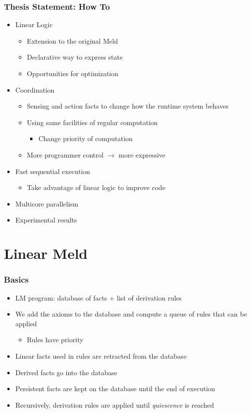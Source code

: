 \documentclass{beamer}
\begin{document}
\begin{frame}[fragile]
   \frametitle{Thesis Statement: How To}
   \begin{itemize}
      \item Linear Logic
      \begin{itemize}
         \item Extension to the original Meld
         \item Declarative way to express state
         \item Opportunities for optimization
      \end{itemize}
      \item Coordination
      \begin{itemize}
         \item Sensing and action facts to change how the runtime system behaves
         \item Using same facilities of regular computation
         \begin{itemize}
            \item Change priority of computation 
         \end{itemize}
         \item More programmer control $\rightarrow$ more expressive
      \end{itemize}
      \item Fast sequential execution
      \begin{itemize}
         \item Take advantage of linear logic to improve code
      \end{itemize}
      \item Multicore parallelism
      \item Experimental results
   \end{itemize}
\end{frame}

\section{Linear Meld}

\begin{frame}[fragile]
   \frametitle{Basics}
   \begin{itemize}
      \item LM program: database of facts + list of derivation rules
      \item We add the axioms to the database and compute a queue of rules that can be applied
      \begin{itemize}
         \item Rules have priority
      \end{itemize}
      \item Linear facts used in rules are retracted from the database
      \item Derived facts go into the database
      \item Persistent facts are kept on the database until the end of execution
      \item Recursively, derivation rules are applied until \emph{quiescence} is reached
   \end{itemize}
\end{frame}
\end{document}
